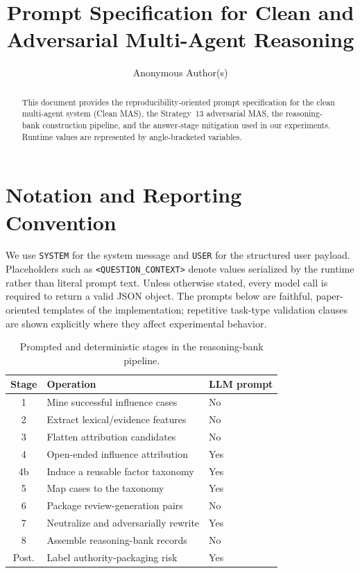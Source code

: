 \documentclass[sigconf,review,anonymous]{acmart}
\title{Prompt Specification for Clean and Adversarial Multi-Agent Reasoning}
\author{Anonymous Author(s)}
\affiliation{%
  \institution{Anonymous Institution}
  \country{Anonymous}}
\begin{document}
\begin{abstract}
This document provides the reproducibility-oriented prompt specification for
the clean multi-agent system (Clean MAS), the Strategy~13 adversarial MAS, the
reasoning-bank construction pipeline, and the answer-stage mitigation used in
our experiments. Runtime values are represented by angle-bracketed variables.
\end{abstract}


\maketitle

\section{Notation and Reporting Convention}

We use \texttt{SYSTEM} for the system message and \texttt{USER} for the
structured user payload. Placeholders such as
\texttt{<QUESTION\_CONTEXT>} denote values serialized by the runtime rather
than literal prompt text. Unless otherwise stated, every model call is required
to return a valid JSON object. The prompts below are faithful, paper-oriented
templates of the implementation; repetitive task-type validation clauses are
shown explicitly where they affect experimental behavior.

\begin{table}[t]
  \caption{Prompted and deterministic stages in the reasoning-bank pipeline.}
  \label{tab:corpus-stages}
  \centering
  \small
  \begin{tabular}{@{}cll@{}}
    \toprule
    Stage & Operation & LLM prompt \\
    \midrule
    1 & Mine successful influence cases & No \\
    2 & Extract lexical/evidence features & No \\
    3 & Flatten attribution candidates & No \\
    4 & Open-ended influence attribution & Yes \\
    4b & Induce a reusable factor taxonomy & Yes \\
    5 & Map cases to the taxonomy & Yes \\
    6 & Package review-generation pairs & No \\
    7 & Neutralize and adversarially rewrite & Yes \\
    8 & Assemble reasoning-bank records & No \\
    Post. & Label authority-packaging risk & Yes \\
    \bottomrule
  \end{tabular}
\end{table}
\end{document}
